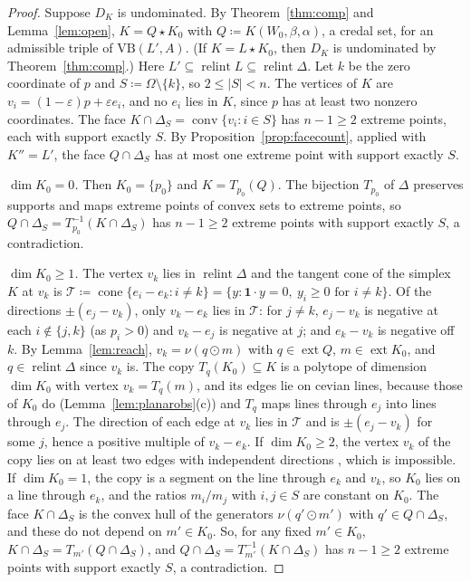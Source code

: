 \documentclass[11pt]{article}
\newcommand{\one}{\mathbf{1}}
\newcommand{\VB}{\mathrm{VB}}
\DeclareMathOperator{\conv}{conv}
\DeclareMathOperator{\cone}{cone}
\DeclareMathOperator{\relint}{relint}
\DeclareMathOperator{\ext}{ext}
\theoremstyle{plain}
\theoremstyle{definition}
\theoremstyle{remark}
\begin{document}
\begin{proof}
Suppose $D_K$ is undominated. By Theorem~\ref{thm:comp} and Lemma~\ref{lem:open},
$K=Q\star K_0$ with $Q\coloneqq K(W_0,\beta,\alpha)$, a credal set, for an admissible
triple of $\VB(L',A)$. (If $K=L\star K_0$, then $D_K$ is undominated by
Theorem~\ref{thm:comp}.) Here $L'\subseteq\relint L\subseteq\relint\Delta$. Let $k$ be the
zero coordinate of $p$ and $S\coloneqq\Omega\setminus\{k\}$, so $2\le|S|<n$. The vertices
of $K$ are $v_i=(1-\varepsilon)p+\varepsilon e_i$, and no $e_i$ lies in $K$, since $p$ has
at least two nonzero coordinates. The face $K\cap\Delta_S=\conv\{v_i:i\in S\}$ has
$n-1\ge2$ extreme points, each with support exactly $S$. By
Proposition~\ref{prop:facecount}, applied with $K''=L'$, the face $Q\cap\Delta_S$ has at
most one extreme point with support exactly $S$.

\emph{$\dim K_0=0$.} Then $K_0=\{p_0\}$ and $K=T_{p_0}(Q)$. The bijection $T_{p_0}$ of
$\Delta$ preserves supports and maps extreme points of convex sets to extreme points, so
$Q\cap\Delta_S=T_{p_0}^{-1}(K\cap\Delta_S)$ has $n-1\ge2$ extreme points with support
exactly $S$, a contradiction.

\emph{$\dim K_0\ge1$.} The vertex $v_k$ lies in $\relint\Delta$ and the tangent cone of the
simplex $K$ at $v_k$ is $\mathcal T\coloneqq\cone\{e_i-e_k:i\ne k\}=\{y:\one\cdot y=0,\ y_i\ge0
\text{ for }i\ne k\}$. Of the directions $\pm(e_j-v_k)$, only $v_k-e_k$ lies in $\mathcal T$: for
$j\ne k$, $e_j-v_k$ is negative at each $i\notin\{j,k\}$ (as $p_i>0$) and $v_k-e_j$ is
negative at $j$; and $e_k-v_k$ is negative off $k$. By Lemma~\ref{lem:reach},
$v_k=\nu(q\odot m)$ with $q\in\ext Q$, $m\in\ext K_0$, and $q\in\relint\Delta$ since $v_k$
is. The copy $T_q(K_0)\subseteq K$ is a polytope of dimension $\dim K_0$ with vertex
$v_k=T_q(m)$, and its edges lie on cevian lines, because those of $K_0$ do
(Lemma~\ref{lem:planarobs}(c)) and $T_q$ maps lines through $e_j$ into lines through
$e_j$. The direction of each edge at $v_k$ lies in $\mathcal T$ and is $\pm(e_j-v_k)$ for some $j$,
hence a positive multiple of $v_k-e_k$. If $\dim K_0\ge2$, the vertex $v_k$ of the copy
lies on at least two edges with independent directions \cite{Ziegler}, which is impossible.
If $\dim K_0=1$, the copy is a segment on the line through $e_k$ and $v_k$, so $K_0$ lies
on a line through $e_k$, and the ratios $m_i/m_j$ with $i,j\in S$ are constant on $K_0$.
The face $K\cap\Delta_S$ is the convex hull of the generators $\nu(q'\odot m')$ with
$q'\in Q\cap\Delta_S$, and these do not depend on $m'\in K_0$. So, for any fixed
$m'\in K_0$, $K\cap\Delta_S=T_{m'}(Q\cap\Delta_S)$, and $Q\cap\Delta_S=T_{m'}^{-1}(K\cap
\Delta_S)$ has $n-1\ge2$ extreme points with support exactly $S$, a contradiction.
\end{proof}
\end{document}
